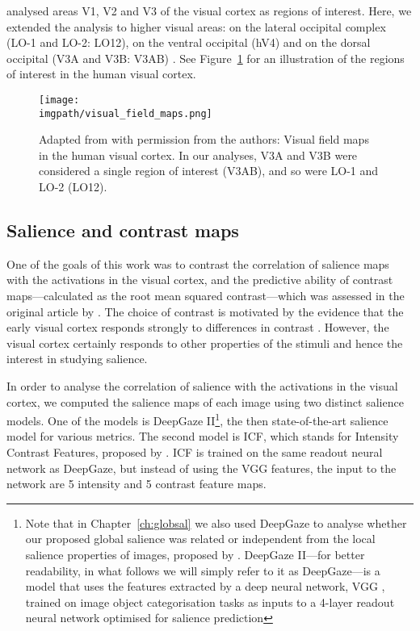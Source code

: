 {\citet{zuiderbaan2017imageidentification} analysed areas V1, V2 and V3 of the visual cortex as regions of interest. Here, we extended the analysis to higher visual areas: on the lateral occipital complex (LO-1 and LO-2: LO12), on the ventral occipital (hV4) and on the dorsal occipital (V3A and V3B: V3AB) \citep{wandell2007visualfield}. See Figure~\ref{fig:imageid-visual_field_maps} for an illustration of the regions of interest in the human visual cortex.

\begin{figure}[htb]
  \begin{center}
    \texttt{[image: \\imgpath/visual\_field\_maps.png]}
  \end{center}
  \caption{Adapted from \citep{wandell2007visualfield} with permission from the authors: Visual field maps in the human visual cortex. In our analyses, V3A and V3B were considered a single region of interest (V3AB), and so were LO-1 and LO-2 (LO12).}
\label{fig:imageid-visual_field_maps}
\end{figure}

\subsection{Salience and contrast maps}
One of the goals of this work was to contrast the correlation of salience maps with the activations in the visual cortex, and the predictive ability of contrast maps---calculated as the root mean squared contrast---which was assessed in the original article by \citet{zuiderbaan2017imageidentification}. The choice of contrast is motivated by the evidence that the early visual cortex responds strongly to differences in contrast \citep{boynton1999contrast, olman2004contrast}. However, the visual cortex certainly responds to other properties of the stimuli and hence the interest in studying salience.

In order to analyse the correlation of salience with the activations in the visual cortex, we computed the salience maps of each image using two distinct salience models. One of the models is  DeepGaze II\footnote{Note that in Chapter~\ref{ch:globsal} we also used DeepGaze to analyse whether our proposed global salience was related or independent from the local salience properties of images, proposed by \citet{kuemmerer2016deepgaze}. DeepGaze II---for better readability, in what follows we will simply refer to it as DeepGaze---is a model that uses the features extracted by a deep neural network, VGG \citep{simonyan2014vgg}, trained on image object categorisation tasks as inputs to a 4-layer readout neural network optimised for salience prediction}, the then state-of-the-art salience model for various metrics. The second model is ICF, which stands for Intensity Contrast Features, proposed by \citet{kuemmerer2017icfdeepgaze}. ICF is trained on the same readout neural network as DeepGaze, but instead of using the VGG features, the input to the network are 5 intensity and 5 contrast feature maps.

}
